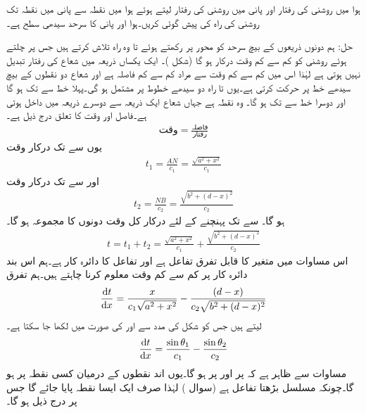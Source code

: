 ہوا میں روشنی کی رفتار  اور پانی میں روشنی کی رفتار  لیتے ہوئے ہوا میں نقطہ  سے پانی میں نقطہ  تک روشنی کی راہ کی پیش گوئی کریں۔ہوا اور پانی کا سرحد سیدھی سطح ہے۔

حل:\quad
ہم دونوں ذریعوں کے بیچ سرحد کو  محور پر رکھتے ہوئے  تا  وہ راہ تلاش کرتے ہیں جس پر چلتے ہوئے روشنی کو کم سے کم وقت درکار ہو گا (شکل )۔ ایک یکساں ذریعہ میں شعاع کی رفتار تبدیل نہیں ہوتی ہے لہٰذا اس میں کم سے کم وقت سے مراد کم سے کم فاصلہ ہے اور شعاع دو نقطوں کے بیچ سیدھے خط پر حرکت کرتی ہے۔یوں  تا  راہ دو سیدھے خطوط پر مشتمل ہو گی۔پہلا خط  سے  تک ہو گا اور دوسرا خط  سے  تک ہو گا۔  وہ نقطہ ہے جہاں شعاع ایک ذریعہ سے دوسرے ذریعہ میں داخل ہوتی ہے۔فاصل اور وقت کا تعلق درج ذیل ہے۔
\begin{align*}
\text{وقت}=\frac{\text{فاصلہ}}{\text{رفتار}}
\end{align*}
یوں  سے  تک درکار وقت
\begin{align*}
t_1=\frac{AN}{c_1}=\frac{\sqrt{a^2+x^2}}{c_1}
\end{align*}
اور  سے  تک درکار وقت
\begin{align*}
t_2=\frac{NB}{c_2}=\frac{\sqrt{b^2+(d-x)^2}}{c_2}
\end{align*}
ہو گا۔ سے  تک پہنچنے کے لئے درکار کل وقت دونوں کا مجموعہ ہو گا۔
\begin{align}\label{مساوات_استعمال_فغما_الف}
t=t_1+t_2=\frac{\sqrt{a^2+x^2}}{c_1}+\frac{\sqrt{b^2+(d-x)^2}}{c_2}
\end{align}
اس مساوات میں  متغیر  کا قابل تفرق تفاعل ہے اور تفاعل کا دائرہ کار  ہے۔ہم اس بند دائرہ کار پر کم سے کم وقت معلوم کرنا چاہتے ہیں۔ہم تفرق
 \begin{align}\label{مساوات_استعمال_فغما_ب}
\frac{\dif t}{\dif x}=\frac{x}{c_1\sqrt{a^2+x^2}}-\frac{(d-x)}{c_2\sqrt{b^2+(d-x)^2}}
\end{align}
لیتے ہیں جس کو شکل  کی مدد سے  اور  کی صورت میں لکھا جا سکتا ہے۔
\begin{align}\label{مساوات_استعمال_فغما_پ}
\frac{\dif t}{\dif x}=\frac{\sin \theta_1}{c_1}-\frac{\sin\theta_2}{c_2}
\end{align} 
مساوات  سے ظاہر ہے کہ  پر  اور  پر
  ہو گا۔یوں اند نقطوں کے درمیان کسی نقطہ  پر  ہو گا۔چونکہ   مسلسل بڑھتا تفاعل ہے (سوال ) لہٰذا صرف ایک ایسا نقطہ پایا جائے گا جس پر درج ذیل ہو گا۔
